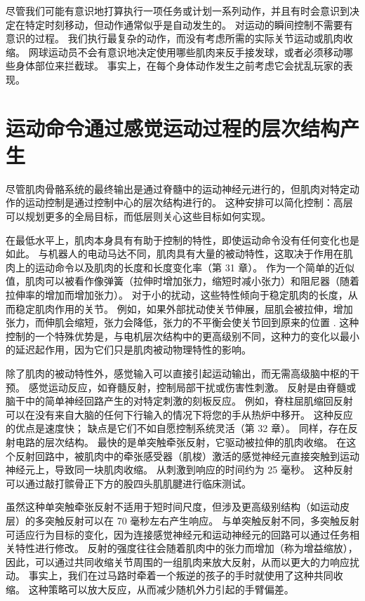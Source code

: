尽管我们可能有意识地打算执行一项任务或计划一系列动作，并且有时会意识到决定在特定时刻移动，但动作通常似乎是自动发生的。 对运动的瞬间控制不需要有意识的过程。 我们执行最复杂的动作，而没有考虑所需的实际关节运动或肌肉收缩。 网球运动员不会有意识地决定使用哪些肌肉来反手接发球，或者必须移动哪些身体部位来拦截球。 事实上，在每个身体动作发生之前考虑它会扰乱玩家的表现。


\section{运动命令通过感觉运动过程的层次结构产生}

尽管肌肉骨骼系统的最终输出是通过脊髓中的运动神经元进行的，但肌肉对特定动作的运动控制是通过控制中心的层次结构进行的。 这种安排可以简化控制：高层可以规划更多的全局目标，而低层则关心这些目标如何实现。

在最低水平上，肌肉本身具有有助于控制的特性，即使运动命令没有任何变化也是如此。 与机器人的电动马达不同，肌肉具有大量的被动特性，这取决于作用在肌肉上的运动命令以及肌肉的长度和长度变化率（第 31 章）。 作为一个简单的近似值，肌肉可以被看作像弹簧（拉伸时增加张力，缩短时减小张力）和阻尼器（随着拉伸率的增加而增加张力）。 对于小的扰动，这些特性倾向于稳定肌肉的长度，从而稳定肌肉作用的关节。 例如，如果外部扰动使关节伸展，屈肌会被拉伸，增加张力，而伸肌会缩短，张力会降低，张力的不平衡会使关节回到原来的位置 . 这种控制的一个特殊优势是，与电机层次结构中的更高级别不同，这种力的变化以最小的延迟起作用，因为它们只是肌肉被动物理特性的影响。

除了肌肉的被动特性外，感觉输入可以直接引起运动输出，而无需高级脑中枢的干预。 感觉运动反应，如脊髓反射，控制局部干扰或伤害性刺激。 反射是由脊髓或脑干中的简单神经回路产生的对特定刺激的刻板反应。 例如，脊柱屈肌缩回反射可以在没有来自大脑的任何下行输入的情况下将您的手从热炉中移开。 这种反应的优点是速度快； 缺点是它们不如自愿控制系统灵活（第 32 章）。 同样，存在反射电路的层次结构。 最快的是单突触牵张反射，它驱动被拉伸的肌肉收缩。 在这个反射回路中，被肌肉中的牵张感受器（肌梭）激活的感觉神经元直接突触到运动神经元上，导致同一块肌肉收缩。 从刺激到响应的时间约为 25 毫秒。 这种反射可以通过敲打髌骨正下方的股四头肌肌腱进行临床测试。

虽然这种单突触牵张反射不适用于短时间尺度，但涉及更高级别结构（如运动皮层）的多突触反射可以在 70 毫秒左右产生响应。 与单突触反射不同，多突触反射可适应行为目标的变化，因为连接感觉神经元和运动神经元的回路可以通过任务相关特性进行修改。 反射的强度往往会随着肌肉中的张力而增加（称为增益缩放），因此，可以通过共同收缩关节周围的一组肌肉来放大反射，从而以更大的力响应扰动。 事实上，我们在过马路时牵着一个叛逆的孩子的手时就使用了这种共同收缩。 这种策略可以放大反应，从而减少随机外力引起的手臂偏差。

